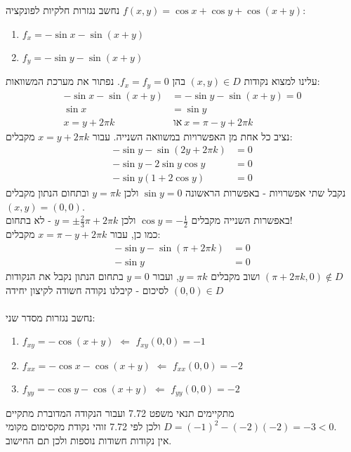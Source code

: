 \documentclass{article}
\begin{document}
נחשב נגזרות חלקיות לפונקציה $f(x,y)=\cos x + \cos y + \cos (x+y)$:
\begin{enumerate}[i]
    \item $f_x=-\sin x -\sin(x+y)$
    \item $f_y = -\sin y - \sin (x+y)$
\end{enumerate}
עלינו למצוא נקודות $(x,y)\in D$ בהן $f_x=f_y=0$. נפתור את מערכת המשוואות:
\begin{align*}
    -\sin x -\sin(x+y) & =-\sin y - \sin (x+y)=0             \\
    \sin x             & = \sin y                            \\
    x = y + 2\pi k     & \ \text{או} \  x = \pi - y + 2\pi k
\end{align*}
נציב כל אחת מן האפשרויות במשוואה השנייה. עבור $x=y+2\pi k$ מקבלים:
\begin{align*}
    -\sin y - \sin (2y+2\pi k) & = 0 \\
    -\sin y - 2\sin y \cos y   & = 0 \\
    -\sin y (1+2\cos y)        & = 0
\end{align*}
נקבל שתי אפשרויות - באפשרות הראשונה $\sin y = 0$ ולכן $y=\pi k$ ובתחום הנתון מקבלים $(x,y)=(0,0)$. \\
באפשרות השנייה מקבלים $\cos y = -\frac{1}{2}$ ולכן $y=\pm\frac{2}{3}\pi+2\pi k$ - לא בתחום!\\
כמו כן, עבור $x=\pi-y+2\pi k$ מקבלים:
\begin{align*}
    -\sin y - \sin(\pi + 2\pi k) & = 0 \\
    -\sin y                      & = 0
\end{align*}
ושוב מקבלים $y=\pi k$, ועבור $y=0$ בתחום הנתון נקבל את הנקודות $(\pi + 2\pi k, 0)\notin D$\\
לסיכום - קיבלנו נקודה חשודה לקיצון יחידה $(0,0)\in D$
\\\\
נחשב נגזרות מסדר שני:
\begin{enumerate}[i]
    \item $f_{xy}=-\cos(x+y)$ $\Leftarrow$ $f_{xy}(0,0)=-1$
    \item $f_{xx}=-\cos x - \cos(x+y)$ $\Leftarrow$ $f_{xx}(0,0)=-2$
    \item $f_{yy}=-\cos y - \cos(x+y)$ $\Leftarrow$ $f_{yy}(0,0)=-2$
\end{enumerate}
מתקיימים תנאי משפט 7.72 ועבור הנקודה המדוברת מתקיים $D=(-1)^2-(-2)(-2)=-3<0$ ולכן לפי 7.72 זוהי נקודת מקסימום מקומי.\\
אין נקודות חשודות נוספות ולכן תם החישוב.
\end{document}
